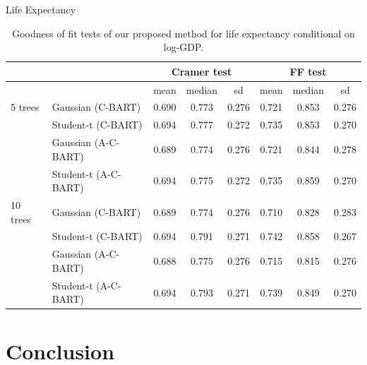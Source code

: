 \documentclass[11pt]{beamer}
\begin{document}
\begin{frame}[allowframebreaks]{Life Expectancy}
	\tiny{\begin{table}[h]
		\centering
		\begin{tabular}{l|l|ccc|ccc}
			\multicolumn{2}{c|}{} &
			\multicolumn{3}{c|}{Cramer test} &
			\multicolumn{3}{c}{FF test} \\
			\hline
			& & mean & median & sd & mean & median & sd \\ 
			\hline
			5 trees & Gaussian (C-BART) & 0.690 & 0.773 & 0.276 & 0.721 & 0.853 & 0.276 \\ 
			& Student-t (C-BART) & 0.694 & 0.777 & 0.272 & 0.735 & 0.853 & 0.270 \\ 
			& Gaussian (A-C-BART) & 0.689 & 0.774 & 0.276 & 0.721 & 0.844 & 0.278 \\ 
			& Student-t (A-C-BART) & 0.694 & 0.775 & 0.272 & 0.735 & 0.859 & 0.270 \\ 
			\hline
			10 trees & Gaussian (C-BART) & 0.689 & 0.774 & 0.276 & 0.710 & 0.828 & 0.283 \\ 
			& Student-t (C-BART) & 0.694 & 0.791 & 0.271 & 0.742 & 0.858 & 0.267 \\ 
			& Gaussian (A-C-BART) & 0.688 & 0.775 & 0.276 & 0.715 & 0.815 & 0.276 \\ 
			& Student-t (A-C-BART) & 0.694 & 0.793 & 0.271 & 0.739 & 0.849 & 0.270 \\ 
		\end{tabular}
		\caption{Goodness of fit tests of our proposed method for life expectancy conditional on log-GDP.}
		\label{tab:LE:p-val}
	\end{table}
	}
    \end{frame}

    \section{Conclusion}
\end{document}
